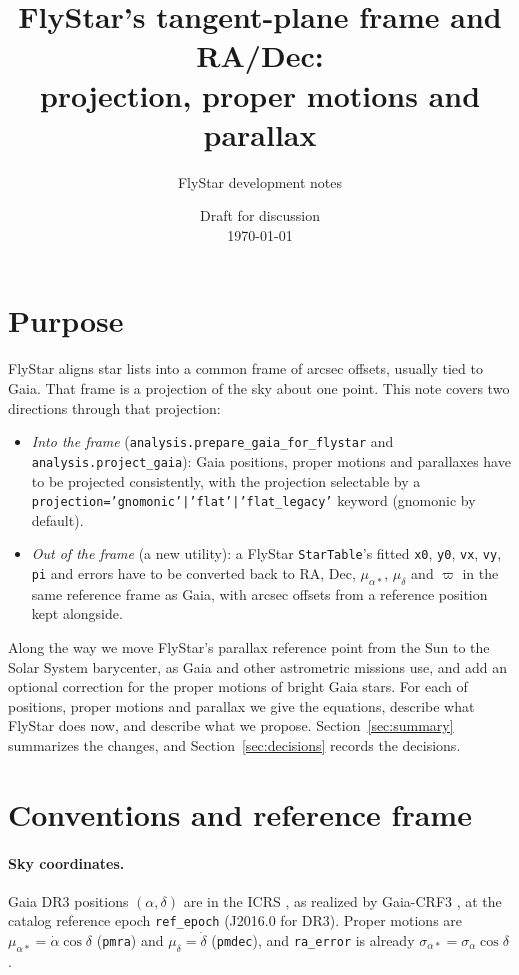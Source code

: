 \documentclass[11pt]{article}
\title{FlyStar's tangent-plane frame and RA/Dec:\\
projection, proper motions and parallax}
\author{FlyStar development notes}
\date{Draft for discussion \\ \today}
\newcommand{\code}[1]{\texttt{#1}}
\begin{document}
\sloppy
\maketitle

\section{Purpose}

FlyStar aligns star lists into a common frame of arcsec offsets, usually tied to
Gaia. That frame is a projection of the sky about one point. This note covers
two directions through that projection:
\begin{itemize}
  \item \emph{Into the frame} (\code{analysis.prepare\_gaia\_for\_flystar} and
    \code{analysis.project\_gaia}): Gaia positions, proper motions and
    parallaxes have to be projected consistently, with the projection
    selectable by a \code{projection='gnomonic'|'flat'|'flat\_legacy'}
    keyword (gnomonic by default).
  \item \emph{Out of the frame} (a new utility): a FlyStar \code{StarTable}'s
    fitted \code{x0}, \code{y0}, \code{vx}, \code{vy}, \code{pi} and errors
    have to be converted back to RA, Dec, $\mu_{\alpha*}$, $\mu_\delta$ and
    $\varpi$ in the same reference frame as Gaia, with arcsec offsets from a
    reference position kept alongside.
\end{itemize}
Along the way we move FlyStar's parallax reference point from the Sun to the
Solar System barycenter, as Gaia and other astrometric missions use, and add
an optional correction for the proper motions of bright Gaia stars.
For each of positions, proper motions and parallax we give the equations,
describe what FlyStar does now, and describe what we propose. Section~\ref{sec:summary}
summarizes the changes, and Section~\ref{sec:decisions} records the decisions.

\section{Conventions and reference frame}
\label{sec:conventions}

\paragraph{Sky coordinates.} Gaia DR3 \citep{Vallenari2023, Lindegren2021a}
positions $(\alpha,\delta)$ are in the ICRS \citep{Ma1998, FeisselMignard1998},
as realized by Gaia-CRF3 \citep{Klioner2022}, at the catalog reference epoch
\code{ref\_epoch} (J2016.0 for DR3). Proper motions are $\mu_{\alpha*} = \dot\alpha\cos\delta$
(\code{pmra}) and $\mu_\delta = \dot\delta$ (\code{pmdec}), and
\code{ra\_error} is already $\sigma_{\alpha*} = \sigma_\alpha\cos\delta$.
\end{document}
